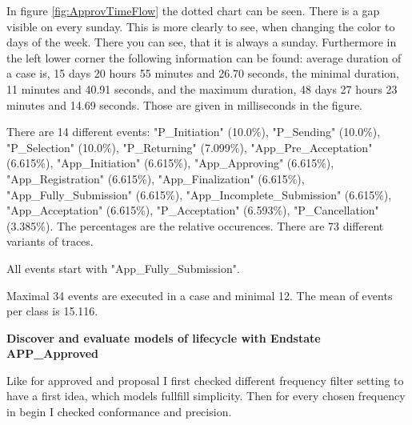 In figure \ref{fig:ApprovTimeFlow} the dotted chart can be seen. There is a gap visible on every sunday. This is more clearly to see, when changing the color to days of the week. There you can see, that it is always a sunday. Furthermore in the left lower corner the following information can be found: average duration of a case is, 15 days 20 hours 55 minutes and 26.70 seconds, the minimal duration, 11 minutes and 40.91 seconds, and the maximum duration, 48 days 27 hours 23 minutes and 14.69 seconds. Those are given in milliseconds in the figure.

There are 14 different events:
"P\_Initiation" (10.0\%), "P\_Sending" (10.0\%), "P\_Selection" (10.0\%), "P\_Returning" (7.099\%), "App\_Pre\_Acceptation" (6.615\%), "App\_Initiation" (6.615\%), "App\_Approving" (6.615\%), "App\_Registration" (6.615\%), "App\_Finalization" (6.615\%), "App\_Fully\_Submission" (6.615\%), "App\_Incomplete\_Submission" (6.615\%), "App\_Acceptation" (6.615\%), "P\_Acceptation" (6.593\%), "P\_Cancellation" (3.385\%). The percentages are the relative occurences.
There are 73 different variants of traces.

All events start with "App\_Fully\_Submission".

Maximal 34 events are executed in a case and minimal 12. The mean of events per class is 15.116.


\textbf{Discover and evaluate models of lifecycle with Endstate APP\_Approved}

Like for approved and proposal I first checked different frequency filter setting to have a first idea, which models fullfill simplicity. Then for every chosen frequency in begin I checked conformance and precision.

